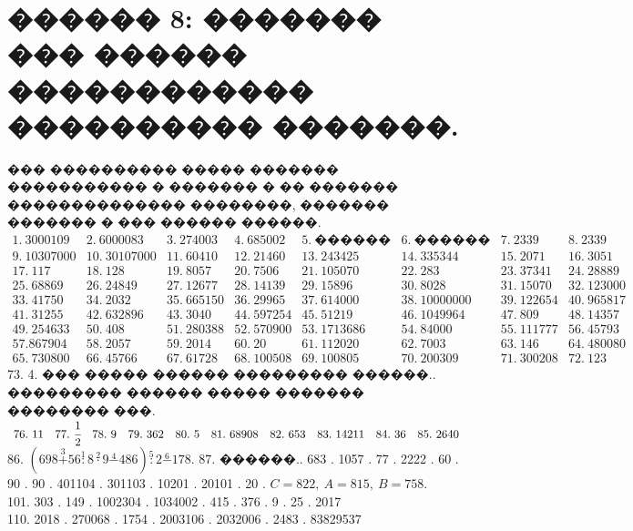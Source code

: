 \documentclass[12pt]{article}
\begin{document}
\section{������ 8: ������� ��� ������ ������������ ���������� �������.}
��� ���������� ����� ������� ����������� � ������� � �� ������� �������������� ��������, ������� ������� � ��� ������ ������.
$\begin{array}{lllllllllll}
1.\ 3000109& 2.\ 6000083& 3.\ 274003& 4.\ 685002& 5.\ \text{������}& 6.\ \text{������}& 7.\ 2339& 8.\ 2339\\ 9.\ 10307000&
10.\ 30107000& 11.\ 60410& 12.\ 21460& 13.\ 243425& 14.\ 335344& 15.\ 2071&
16.\ 3051\\ 17.\ 117& 18.\ 128&
19.\ 8057& 20.\ 7506& 21.\ 105070& 22.\ 283& 23.\ 37341& 24.\ 28889\\
25.\ 68869& 26.\ 24849& 27.\ 12677& 28.\ 14139& 29.\ 15896& 30.\ 8028&
31.\ 15070& 32.\ 123000\\
33.\ 41750& 34.\ 2032& 35.\ 665150& 36.\ 29965& 37.\ 614000& 38.\ 10000000&
39.\ 122654& 40.\ 965817\\ 41.\ 31255& 42.\ 632896& 43.\ 3040& 44.\ 597254&
45.\ 51219& 46.\ 1049964& 47.\ 809& 48.\ 14357\\
49.\ 254633& 50.\ 408& 51.\ 280388& 52.\ 570900& 53.\ 1713686& 54.\ 84000&
55.\ 111777& 56.\ 45793\\ 57. 867904& 58.\ 2057& 59.\ 2014& 60.\ 20&
61.\ 112020& 62.\ 7003& 63.\ 146& 64.\ 480080\\
65.\ 730800& 66.\ 45766& 67.\ 61728& 68.\ 100508& 69.\ 100805& 70.\ 200309&
71.\ 300208& 72.\ 123 \end{array}$\\
73. 4. ��� ����� ������ ��������� ������.. ��������� ������ ����� ������� �������� ���.\\
$\begin{array}{lllllllllllll}
76.\ 11& 77.\ \cfrac{1}{2}& 78.\ 9 &79.\ 362& 80.\ 5& 81.\ 68908&
82.\ 653& 83.\ 14211&
84.\ 36& 85.\ 2640
\end{array}$\\
86. $(698\stackrel{3}{+}56\stackrel{1}{:}8\stackrel{2}{\cdot}9\stackrel{4}{-}486)\stackrel{5}{:}2\stackrel{6}{-}178.$
87. ������.. 683 . 1057 . 77 . 2222 . 60 . 90 . 90 . 401104 . 301103 . 10201 . 20101 . 20 . $C=822,\ A=815,\ B=758.$ \\ 101. 303 . 149 . 1002304 . 1034002 . 415 . 376 . 9 . 25 . 2017 \\ 110. 2018 . 270068 . 1754 . 2003106 . 2032006 . 2483 . 83829537\\
\end{document}
